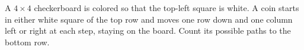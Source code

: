 A $4\times4$ checkerboard is colored so that the top-left square is white. A coin starts in either white square of the top row and moves one row down and one column left or right at each step, staying on the board. Count its possible paths to the bottom row.
